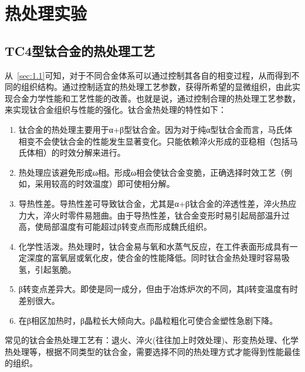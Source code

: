 \chapter{热处理实验}
\section{TC4型钛合金的热处理工艺}
从~\ref{sec:1.1}可知，对于不同合金体系可以通过控制其各自的相变过程，从而得到不同的组织结构。通过控制适宜的热处理工艺参数，获得所希望的显微组织，由此实现合金力学性能和工艺性能的改善。也就是说，通过控制合理的热处理工艺参数，来实现钛合金组织与性能的强化。钛合金热处理的特性如下：

\begin{enumerate}
	\item 钛合金的热处理主要用于α+β型钛合金。因为对于纯α型钛合金而言，马氏体相变不会使钛合金的性能发生显著变化。只能依赖淬火形成的亚稳相（包括马氏体相）的时效分解来进行。
	\item 热处理应该避免形成ω相。形成ω相会使钛合金变脆，正确选择时效工艺（例如，采用较高的时效温度）即可使相分解。
	\item 导热性差。导热性差可导致钛合金，尤其是α+β钛合金的淬透性差，淬火热应力大，淬火时零件易翘曲。由于导热性差，钛合金变形时易引起局部温升过高，使局部温度有可能超过β转变点而形成魏氏组织。
	\item 化学性活泼。热处理时，钛合金易与氧和水蒸气反应，在工件表面形成具有一定深度的富氧层或氧化皮，使合金的性能降低。同时钛合金热处理时容易吸氢，引起氢脆。
	\item β转变点差异大。即使是同一成分，但由于冶炼炉次的不同，其β转变温度有时差别很大。
	\item 在β相区加热时，β晶粒长大倾向大。β晶粒粗化可使合金塑性急剧下降。
\end{enumerate}

常见的钛合金热处理工艺有：退火、淬火(往往加上时效处理)、形变热处理、化学热处理等，根据不同类型的钛合金，需要选择不同的热处理方式才能得到性能最佳的组织。



